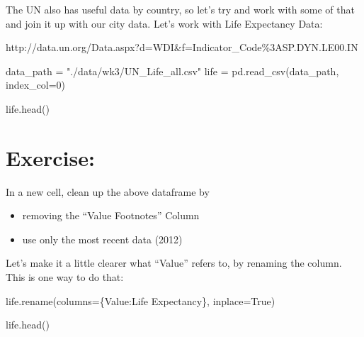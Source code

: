 \documentclass[
  letterpaper,
  DIV=11,
  numbers=noendperiod]{scrreprt}
\newenvironment{Shaded}{\begin{snugshade}}{\end{snugshade}}
\newcommand{\DecValTok}[1]{\textcolor[rgb]{0.68,0.00,0.00}{#1}}
\newcommand{\NormalTok}[1]{\textcolor[rgb]{0.00,0.23,0.31}{#1}}
\newcommand{\OperatorTok}[1]{\textcolor[rgb]{0.37,0.37,0.37}{#1}}
\newcommand{\StringTok}[1]{\textcolor[rgb]{0.13,0.47,0.30}{#1}}
\newcommand{\VariableTok}[1]{\textcolor[rgb]{0.07,0.07,0.07}{#1}}
\providecommand{\tightlist}{%
  \setlength{\itemsep}{0pt}\setlength{\parskip}{0pt}}\usepackage{longtable,booktabs,array}
\begin{document}
The UN also has useful data by country, so let's try and work with some
of that and join it up with our city data. Let's work with Life
Expectancy Data:

http://data.un.org/Data.aspx?d=WDI\&f=Indicator\_Code\%3ASP.DYN.LE00.IN

\begin{Shaded}
\begin{Highlighting}[]
\NormalTok{data\_path }\OperatorTok{=} \StringTok{"./data/wk3/UN\_Life\_all.csv"}
\NormalTok{life }\OperatorTok{=}\NormalTok{ pd.read\_csv(data\_path, index\_col}\OperatorTok{=}\DecValTok{0}\NormalTok{)}
\end{Highlighting}
\end{Shaded}

\begin{Shaded}
\begin{Highlighting}[]
\NormalTok{life.head()}
\end{Highlighting}
\end{Shaded}

\hypertarget{exercise-15}{%
\section{Exercise:}\label{exercise-15}}

In a new cell, clean up the above dataframe by

\begin{itemize}
\tightlist
\item
  removing the ``Value Footnotes'' Column
\item
  use only the most recent data (2012)
\end{itemize}

Let's make it a little clearer what ``Value'' refers to, by renaming the
column. This is one way to do that:

\begin{Shaded}
\begin{Highlighting}[]
\NormalTok{life.rename(columns}\OperatorTok{=}\NormalTok{\{}\StringTok{\textquotesingle{}Value\textquotesingle{}}\NormalTok{:}\StringTok{\textquotesingle{}Life Expectancy\textquotesingle{}}\NormalTok{\}, inplace}\OperatorTok{=}\VariableTok{True}\NormalTok{)}
\end{Highlighting}
\end{Shaded}

\begin{Shaded}
\begin{Highlighting}[]
\NormalTok{life.head()}
\end{Highlighting}
\end{Shaded}
\end{document}
